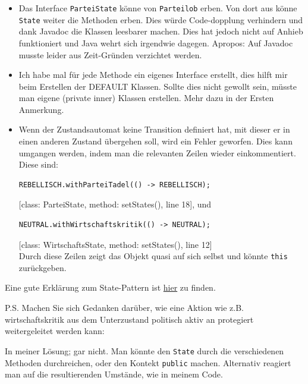 \documentclass{article}
\newcommand{\gqq}[1]{\glqq{}#1\grqq{}}
\begin{document}
\begin{enumerate}[label=\alph*.]
\begin{itemize}
                \item Das Interface \texttt{ParteiState} könne von \texttt{Parteilob} erben.
                    Von dort aus könne \texttt{State} weiter die Methoden erben.
                    Dies würde Code-dopplung verhindern und dank Javadoc die Klassen leesbarer machen.
                    Dies hat jedoch nicht auf Anhieb funktioniert und Java wehrt sich irgendwie dagegen.
                    Apropos: Auf Javadoc musste leider aus Zeit-Gründen verzichtet werden.

                \item Ich habe mal für jede Methode ein eigenes Interface erstellt, dies hilft mir beim Erstellen der DEFAULT Klassen.
                    Sollte dies nicht gewollt sein, müsste man eigene (private inner) Klassen erstellen.
                    Mehr dazu in der Ersten Anmerkung. 

                \item Wenn der Zustandsautomat keine Transition definiert hat, mit dieser er in einen anderen Zustand übergehen soll, wird ein Fehler geworfen.
                    Dies kann umgangen werden, indem man die relevanten Zeilen wieder einkommentiert.
                    Diese sind:
                    \begin{verbatim}
REBELLISCH.withParteiTadel(() -> REBELLISCH);
                    \end{verbatim}
                    [class: ParteiState, method: setStates(), line 18], und
                    \begin{verbatim}
NEUTRAL.withWirtschaftskritik(() -> NEUTRAL);
                    \end{verbatim}
                    [class: WirtschaftsState, method: setStates(), line 12]\\
                    Durch diese Zeilen zeigt das Objekt quasi auf sich selbst und könnte \texttt{this} zurückgeben.
            \end{itemize}
            
            Eine gute Erklärung zum State-Pattern ist \href{https://www.philipphauer.de/study/se/design-pattern/state.php}{hier} zu finden.

            P.S. Machen Sie sich Gedanken darüber, wie eine Aktion wie z.B. \gqq{wirtschaftskritik} aus dem Unterzustand \gqq{politisch aktiv} an protegiert weitergeleitet werden kann:

            In meiner Lösung; gar nicht.
            Man könnte den \texttt{State} durch die verschiedenen Methoden durchreichen, oder den Kontekt \texttt{public} machen.
            Alternativ reagiert man auf die resultierenden Umstände, wie in meinem Code.
    \end{enumerate}
\end{document}
